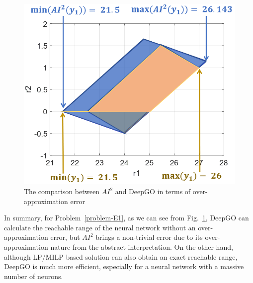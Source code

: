 \begin{figure}[t]
	\centering
	\includegraphics[width=0.55\linewidth]{images/robustnessVerification/Capture9.PNG}
	\caption{The comparison between $AI^2$ and DeepGO in terms of over-approximation error}
	\label{fig-E12}
\end{figure}

In summary, for Problem~\ref{problem-E1}, as we can see from Fig.~\ref{fig-E12}, DeepGO can calculate the reachable range of the neural network without an over-approximation error, but $AI^2$ brings a non-trivial error due to its over-approximation nature from the abstract interpretation. On the other hand, although LP/MILP based solution can also obtain an exact reachable range, DeepGO is much more efficient, especially for a neural network with a massive number of neurons.



